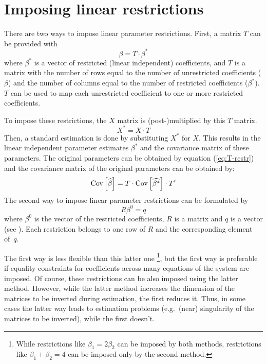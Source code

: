 \section{Imposing linear restrictions}\label{sec:Restrictions}

There are two ways to impose linear parameter restrictions.
First, a matrix $T$ can be provided with
\begin{equation}
   \beta = T \cdot \beta^* \label{eq:T-restr} 
\end{equation}
where $\beta^*$ is a vector of restricted (linear independent) coefficients,
and $T$ is a matrix with the number of rows equal to the number of
unrestricted coefficients ($\beta$) and
the number of columns equal to the number of restricted coefficients
($\beta^*$).
$T$ can be used to map each unrestricted coefficient to one or more
restricted coefficients.

To impose these restrictions, the $X$ matrix is
(post-)multiplied by this $T$ matrix.
\begin{equation}
    X^* = X \cdot T
\end{equation}
Then, a standard estimation is done by substituting $X^*$ for $X$.
This results in the linear independent parameter estimates $\beta^*$ and
the covariance matrix of these parameters.
The original parameters can be obtained by equation (\ref{eq:T-restr})
and the covariance matrix of the original parameters
can be obtained by:
\begin{equation}
   \text{Cov} \left[ \widehat{\beta} \right] = T \cdot \text{Cov} \left[ \widehat{\beta^*} \right] \cdot T'
\end{equation}
The second way to impose linear parameter restrictions
can be formulated by
\begin{equation}
   R \beta^0 = q
\end{equation}
where $\beta^0$ is the vector of the restricted coefficients, 
$R$ is a matrix and $q$ is a vector (see \citealp[p.\ 100]{greene03}).
Each restriction belongs to one row of $R$ and the corresponding 
element of~$q$.

The first way is less flexible than this latter one%
\footnote{
While restrictions like $\beta_1 = 2 \beta_2$ can be imposed by
both methods,
restrictions like $\beta_1 + \beta_2 = 4$ can be imposed only
by the second method.
}, 
but the first way is preferable if equality constraints for coefficients
across many equations of the system are imposed. 
Of course, these restrictions can be also imposed using
the latter method.
However, while the latter method increases the dimension of the 
matrices to be inverted during estimation, the first reduces it. 
Thus, in some cases the latter way leads to estimation problems
(e.g.\ (near) singularity of the matrices to be inverted),
while the first doesn't.


